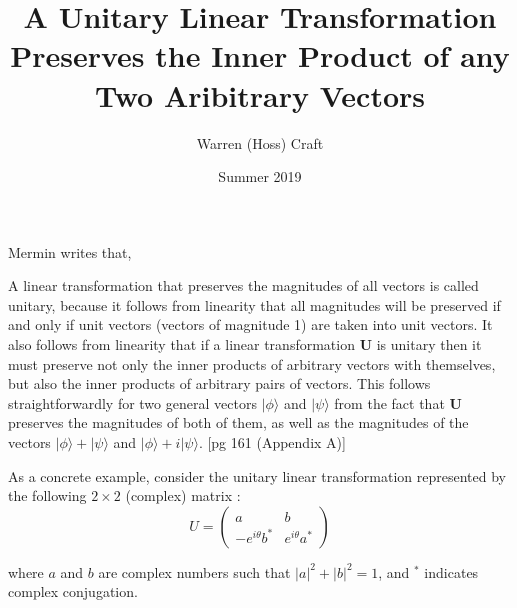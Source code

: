 \documentclass{article}
\title{A Unitary Linear Transformation Preserves the Inner Product of any Two Aribitrary Vectors}
\author{Warren (Hoss) Craft}
\date{Summer 2019}
\begin{document}
\maketitle

\flushleft


Mermin \cite{Mermin_2007} writes that,
\vspace{0.125in}
\begin{addmargin}[0.25in]{0.25in}
A linear transformation that preserves the magnitudes of all vectors is called unitary, because it follows from linearity that all magnitudes will be preserved if and only if unit vectors (vectors of magnitude 1) are taken into unit vectors. It also follows from linearity that if a linear transformation \textbf{U} is unitary then it must preserve not only the inner products of arbitrary vectors with themselves, but also the inner products of arbitrary pairs of vectors. This follows straightforwardly for two general vectors $|\phi\rangle$ and $|\psi\rangle$ from the fact that \textbf{U} preserves the magnitudes of both of them, as well as the magnitudes of the vectors $|\phi\rangle + |\psi\rangle$ and $|\phi\rangle + i|\psi\rangle$. [pg 161 (Appendix A)]
\end{addmargin}

\vspace{0.125in}

As a concrete example, consider the unitary linear transformation represented by the following $2 \times 2$ (complex) matrix \cite{wikipedia:UnitaryMatrix}:
\[
U = \begin{pmatrix}
a & b\\ -e^{i\theta}b^{*} & e^{i\theta}a^{*}
\end{pmatrix}
\]

where $a$ and $b$ are complex numbers such that $|a|^2 + |b|^2 = 1$, and $^*$ indicates complex conjugation.

\vspace{0.125in}
\end{document}
